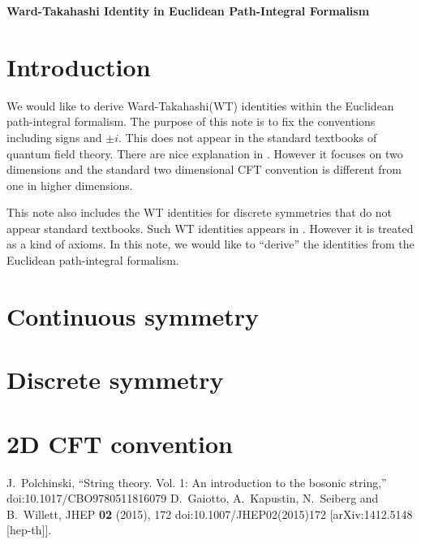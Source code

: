 \documentclass[12pt]{scrartcl}
\begin{document}
\begin{center}
{\bfseries \sffamily \LARGE Ward-Takahashi Identity in Euclidean Path-Integral Formalism}  \\

\vspace{0.5cm}
\end{center}

\section{Introduction}
We would like to derive Ward-Takahashi(WT) identities within the Euclidean path-integral formalism. The purpose of this note is to fix the conventions including signs and $\pm i$.  This does not appear in the standard textbooks of quantum field theory.  There are nice explanation in \cite{Polchinski:1998rq}. However it focuses on two dimensions and the standard two dimensional CFT convention is different from one in higher dimensions.

This note also includes the WT identities for discrete symmetries that do not appear standard textbooks.  Such WT identities appears in \cite{Gaiotto:2014kfa}.  However it is treated as a kind of axioms.  In this note, we would like to ``derive'' the identities from the Euclidean path-integral formalism.

\section{Continuous symmetry}

\section{Discrete symmetry}

\section{2D CFT convention}


\begin{thebibliography}{9}
J.~Polchinski,
``String theory. Vol. 1: An introduction to the bosonic string,''
doi:10.1017/CBO9780511816079
D.~Gaiotto, A.~Kapustin, N.~Seiberg and B.~Willett,
JHEP \textbf{02} (2015), 172
doi:10.1007/JHEP02(2015)172
[arXiv:1412.5148 [hep-th]].
\end{thebibliography}
\end{document}
